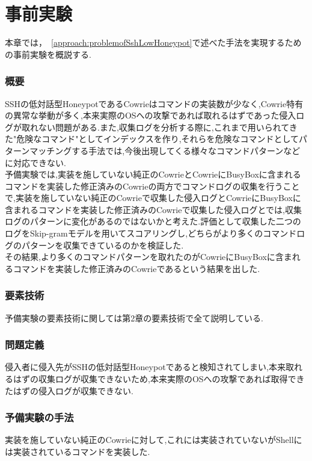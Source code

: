 \chapter{事前実験}
\label{prex}

本章では，~\ref{approach:problemofSshLowHoneypot}で述べた手法を実現するための事前実験を概説する.

\subsection{概要}
\label{prex:abst}
SSHの低対話型HoneypotであるCowrieはコマンドの実装数が少なく,Cowrie特有の異常な挙動が多く,本来実際のOSへの攻撃であれば取れるはずであった侵入ログが取れない問題がある.また,収集ログを分析する際に,これまで用いられてきた"危険なコマンド"としてインデックスを作り,それらを危険なコマンドとしてパターンマッチングする手法では,今後出現してくる様々なコマンドパターンなどに対応できない.\\
予備実験では,実装を施していない純正のCowrieとCowrieにBusyBoxに含まれるコマンドを実装した修正済みのCowrieの両方でコマンドログの収集を行うことで,実装を施していない純正のCowrieで収集した侵入ログとCowrieにBusyBoxに含まれるコマンドを実装した修正済みのCowrieで収集した侵入ログとでは,収集ログのパターンに変化があるのではないかと考えた.評価として収集した二つのログをSkip-gramモデルを用いてスコアリングし,どちらがより多くのコマンドログのパターンを収集できているのかを検証した.\\
その結果,より多くのコマンドパターンを取れたのがCowrieにBusyBoxに含まれるコマンドを実装した修正済みのCowrieであるという結果を出した.

\subsection{要素技術}
\label{prex:tech}
予備実験の要素技術に関しては第2章の要素技術で全て説明している.

\subsection{問題定義}
\label{prex:method}
侵入者に侵入先がSSHの低対話型Honeypotであると検知されてしまい,本来取れるはずの収集ログが収集できないため,本来実際のOSへの攻撃であれば取得できたはずの侵入ログが収集できない.

\subsection{予備実験の手法}
\label{prex:appr}
実装を施していない純正のCowrieに対して,これには実装されていないがShellには実装されているコマンドを実装した.

